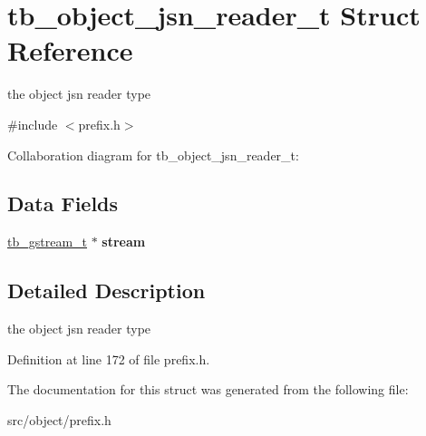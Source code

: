 \hypertarget{structtb__object__jsn__reader__t}{\section{tb\-\_\-object\-\_\-jsn\-\_\-reader\-\_\-t Struct Reference}
\label{d8/dc7/structtb__object__jsn__reader__t}
}


the object jsn reader type  




{\ttfamily \#include $<$prefix.\-h$>$}



Collaboration diagram for tb\-\_\-object\-\_\-jsn\-\_\-reader\-\_\-t\-:
\subsection*{Data Fields}
\begin{DoxyCompactItemize}
\item 
\hypertarget{structtb__object__jsn__reader__t_a5cdec9054b33dcf58c44339e69674b64}{\hyperlink{structtb__gstream__t}{tb\-\_\-gstream\-\_\-t} $\ast$ {\bfseries stream}}\label{d8/dc7/structtb__object__jsn__reader__t_a5cdec9054b33dcf58c44339e69674b64}

\end{DoxyCompactItemize}


\subsection{Detailed Description}
the object jsn reader type 

Definition at line 172 of file prefix.\-h.



The documentation for this struct was generated from the following file\-:\begin{DoxyCompactItemize}
\item 
src/object/prefix.\-h\end{DoxyCompactItemize}
